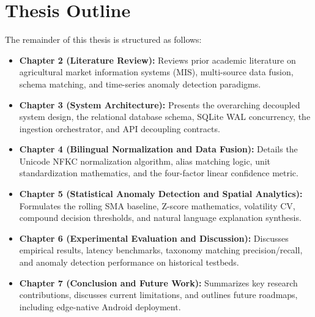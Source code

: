 \section{Thesis Outline}
The remainder of this thesis is structured as follows:
\begin{itemize}
    \item \textbf{Chapter 2 (Literature Review):} Reviews prior academic literature on agricultural market information systems (MIS), multi-source data fusion, schema matching, and time-series anomaly detection paradigms.
    \item \textbf{Chapter 3 (System Architecture):} Presents the overarching decoupled system design, the relational database schema, SQLite WAL concurrency, the ingestion orchestrator, and API decoupling contracts.
    \item \textbf{Chapter 4 (Bilingual Normalization and Data Fusion):} Details the Unicode NFKC normalization algorithm, alias matching logic, unit standardization mathematics, and the four-factor linear confidence metric.
    \item \textbf{Chapter 5 (Statistical Anomaly Detection and Spatial Analytics):} Formulates the rolling SMA baseline, Z-score mathematics, volatility CV, compound decision thresholds, and natural language explanation synthesis.
    \item \textbf{Chapter 6 (Experimental Evaluation and Discussion):} Discusses empirical results, latency benchmarks, taxonomy matching precision/recall, and anomaly detection performance on historical testbeds.
    \item \textbf{Chapter 7 (Conclusion and Future Work):} Summarizes key research contributions, discusses current limitations, and outlines future roadmaps, including edge-native Android deployment.
\end{itemize}
